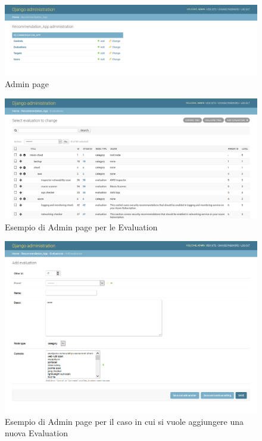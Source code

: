 \begin{figure}
	\includegraphics[scale=0.3]{images/MCRS_adminpage.png}
	\caption{Admin page}
	\label{fig:MCRS_adminpage}
\end{figure}

\begin{figure}
	\includegraphics[scale=0.3]{images/MCRS_adminpage_evaluationEX.png}
	\caption{Esempio di Admin page per le Evaluation}
	\label{fig:MCRS_adminpage_evaluationEX}
\end{figure}

\begin{figure}
	\includegraphics[scale=0.55]{images/MCRS_adminpage_evaluationEX_add.png}
	\caption{Esempio di Admin page per il caso in cui si vuole aggiungere una nuova Evaluation}
	\label{fig:MCRS_adminpage_evaluationEX_add}
\end{figure}




